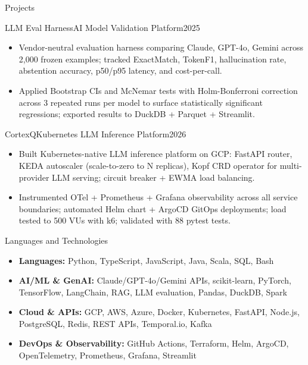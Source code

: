 \documentclass[]{mcdowellcv}
\begin{document}
\begin{cvsection}{Projects}
  \begin{cvsubsection}{LLM Eval Harness}{AI Model Validation Platform}{2025}
    \begin{itemize}
      \item Vendor-neutral evaluation harness comparing Claude, GPT-4o, Gemini across 2,000 frozen examples; tracked ExactMatch, TokenF1, hallucination rate, abstention accuracy, p50/p95 latency, and cost-per-call.
      \item Applied Bootstrap CIs and McNemar tests with Holm-Bonferroni correction across 3 repeated runs per model to surface statistically significant regressions; exported results to DuckDB + Parquet + Streamlit.
    \end{itemize}
    \vspace{-1.5pt}
  \end{cvsubsection}

  \begin{cvsubsection}{CortexQ}{Kubernetes LLM Inference Platform}{2026}
    \begin{itemize}
      \item Built Kubernetes-native LLM inference platform on GCP: FastAPI router, KEDA autoscaler (scale-to-zero to N replicas), Kopf CRD operator for multi-provider LLM serving; circuit breaker + EWMA load balancing.
      \item Instrumented OTel + Prometheus + Grafana observability across all service boundaries; automated Helm chart + ArgoCD GitOps deployments; load tested to 500 VUs with k6; validated with 88 pytest tests.
    \end{itemize}
  \end{cvsubsection}
\end{cvsection}

\begin{cvsection}{Languages and Technologies}
  \begin{cvsubsection}{}{}{}
    \begin{itemize}
      \item \textbf{Languages:} Python, TypeScript, JavaScript, Java, Scala, SQL, Bash
      \item \textbf{AI/ML \& GenAI:} Claude/GPT-4o/Gemini APIs, scikit-learn, PyTorch, TensorFlow, LangChain, RAG, LLM evaluation, Pandas, DuckDB, Spark
      \item \textbf{Cloud \& APIs:} GCP, AWS, Azure, Docker, Kubernetes, FastAPI, Node.js, PostgreSQL, Redis, REST APIs, Temporal.io, Kafka
      \item \textbf{DevOps \& Observability:} GitHub Actions, Terraform, Helm, ArgoCD, OpenTelemetry, Prometheus, Grafana, Streamlit
    \end{itemize}
  \end{cvsubsection}
\end{cvsection}
\end{document}
